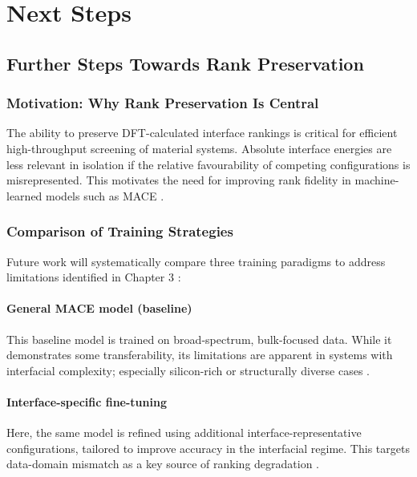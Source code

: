 \chapter{Next Steps} \label{chapter:next_steps}

\section{Further Steps Towards Rank Preservation} \label{section:rank_preservation}

\subsection{Motivation: Why Rank Preservation Is Central}

The ability to preserve DFT-calculated interface rankings is critical for efficient high-throughput screening of material systems. Absolute interface energies are less relevant in isolation if the relative favourability of competing configurations is misrepresented. This motivates the need for improving rank fidelity in machine-learned models such as MACE .

\subsection{Comparison of Training Strategies}

Future work will systematically compare three training paradigms to address limitations identified in Chapter 3 :

\subsubsection{General MACE model (baseline)}

This baseline model is trained on broad-spectrum, bulk-focused data. While it demonstrates some transferability, its limitations are apparent in systems with interfacial complexity; especially silicon-rich or structurally diverse cases .

\subsubsection{Interface-specific fine-tuning}

Here, the same model is refined using additional interface-representative configurations, tailored to improve accuracy in the interfacial regime. This targets data-domain mismatch as a key source of ranking degradation .

